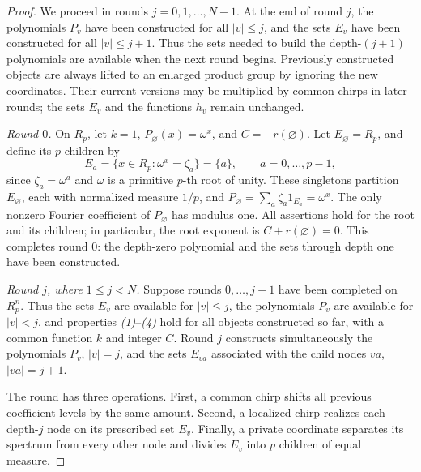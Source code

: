 \documentclass[10pt,a4paper]{amsart}
\newcommand{\R}{R}
\begin{document}
\begin{proof}
We proceed in rounds \(j=0,1,\ldots,N-1\). At the end of round \(j\),
the polynomials \(P_v\) have been constructed for all \(|v|\leq j\),
and the sets \(E_v\) have been constructed for all \(|v|\leq j+1\).
Thus the sets needed to build the depth-\((j+1)\) polynomials are
available when the next round begins. Previously constructed objects
are always lifted to an enlarged product group by ignoring the new
coordinates. Their current versions may be multiplied by common
chirps in later rounds; the sets \(E_v\) and the functions \(h_v\)
remain unchanged.

\emph{Round \(0\).}
On \(\R_p\), let \(k=1\), \(P_\varnothing(x)=\omega^x\), and
\(C=-r(\varnothing)\). 
Let \(E_\varnothing=\R_p\), and define its
\(p\) children by
\[
 E_a=\{x\in\R_p:\omega^x=\zeta_a\}=\{a\},
 \qquad a=0,\ldots,p-1,
\]
since \(\zeta_a=\omega^a\) and \(\omega\) is a primitive \(p\)-th
root of unity. These singletons partition \(E_\varnothing\), each
with normalized measure \(1/p\), and
\(P_\varnothing=\sum_a\zeta_a1_{E_a}=\omega^x\).
The only nonzero Fourier coefficient of \(P_\varnothing\) has modulus one.
All assertions hold for the root and its children; in particular,
the root exponent is \(C+r(\varnothing)=0\).
This completes round \(0\): the depth-zero polynomial and the sets
through depth one have been constructed.

\emph{Round \(j\), where \(1\leq j<N\).}
Suppose rounds \(0,\ldots,j-1\) have been completed on \(\R_p^n\).
Thus the sets \(E_v\) are available for \(|v|\leq j\), the
polynomials \(P_v\) are available for \(|v|<j\), and properties
\emph{(1)}--\emph{(4)} hold for all objects constructed so far, with
a common function \(k\) and integer \(C\). Round \(j\) constructs
simultaneously the polynomials \(P_v\), \(|v|=j\), and the sets
\(E_{va}\) associated with the child nodes \(va\), \(|va|=j+1\).

The round has three operations. First, a common chirp shifts all
previous coefficient levels by the same amount. Second, a localized
chirp realizes each depth-\(j\) node on its prescribed set \(E_v\).
Finally, a private coordinate separates its spectrum from every other
node and divides \(E_v\) into \(p\) children of equal measure.


\end{proof}
\end{document}
